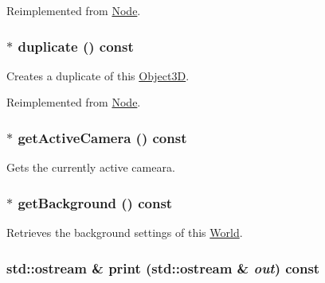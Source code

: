 Reimplemented from \hyperlink{classm3g_1_1Node_8aad1ceab4c2a03609c8a42324ce484d}{Node}.\hypertarget{classm3g_1_1World_efde97aaf753d48fff769d9011f187f2}{
\subsubsection[{duplicate}]{ $\ast$ duplicate () const}}
\label{classm3g_1_1World_efde97aaf753d48fff769d9011f187f2}


Creates a duplicate of this \hyperlink{classm3g_1_1Object3D}{Object3D}. 

Reimplemented from \hyperlink{classm3g_1_1Node_0b9f7531a4b56d34f47aeb1fff0d37e0}{Node}.\hypertarget{classm3g_1_1World_812e01ec4fd0fd872b0ca5ea6a30b2f6}{
\subsubsection[{getActiveCamera}]{ $\ast$ getActiveCamera () const}}
\label{classm3g_1_1World_812e01ec4fd0fd872b0ca5ea6a30b2f6}


Gets the currently active cameara. \hypertarget{classm3g_1_1World_fb10ab7fd2ad14b7b1d49caf129670e0}{
\subsubsection[{getBackground}]{ $\ast$ getBackground () const}}
\label{classm3g_1_1World_fb10ab7fd2ad14b7b1d49caf129670e0}


Retrieves the background settings of this \hyperlink{classm3g_1_1World}{World}. \hypertarget{classm3g_1_1World_6fea17fa1532df3794f8cb39cb4f911f}{
\subsubsection[{print}]{\setlength{\rightskip}{0pt plus 5cm}std::ostream \& print (std::ostream \& {\em out}) const}}
\label{classm3g_1_1World_6fea17fa1532df3794f8cb39cb4f911f}


